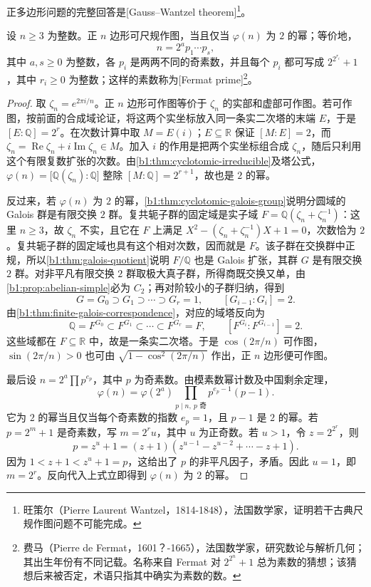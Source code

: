 \ProseParagraphBreak
正多边形问题的完整回答是[Gauss--Wantzel theorem]\footnote{旺策尔（Pierre Laurent Wantzel，1814-1848），法国数学家，证明若干古典尺规作图问题不可能完成。}。

\begin{theorem}\label{b1:thm:constructible-polygon}
	设 \(n\geq3\) 为整数。正 \(n\) 边形可尺规作图，当且仅当 \(\varphi(n)\) 为 \(2\) 的幂；等价地，
	\[
		n=2^a p_1\cdots p_s,
	\]
	其中 \(a,s\geq0\) 为整数，各 \(p_i\) 是两两不同的奇素数，并且每个 \(p_i\) 都可写成 \(2^{2^{r_i}}+1\)，其中 \(r_i\geq0\) 为整数；这样的素数称为[Fermat prime]\footnote{费马（Pierre de Fermat，1601？-1665），法国数学家，研究数论与解析几何；其出生年份有不同记载。名称来自 Fermat 对 \(2^{2^n}+1\) 总为素数的猜想；该猜想后来被否定，术语只指其中确实为素数的数。}。
\end{theorem}
\begin{proof}
	取 \(\zeta_n=e^{2\pi i/n}\)。正 \(n\) 边形可作图等价于 \(\zeta_n\) 的实部和虚部可作图。若可作图，按前面的合成域论证，将这两个实坐标放入同一条实二次塔的末端 \(E\)，于是 \([E:\mathbb Q]=2^r\)。在次数计算中取 \(M=E(i)\)；\(E\subseteq\mathbb R\) 保证 \([M:E]=2\)，而 \(\zeta_n=\operatorname{Re}\zeta_n+i\operatorname{Im}\zeta_n\in M\)。加入 \(i\) 的作用是把两个实坐标组合成 \(\zeta_n\)，随后只利用这个有限复数扩张的次数。由\cref{b1:thm:cyclotomic-irreducible}及塔公式，\(\varphi(n)=\bigl[\mathbb Q(\zeta_n):\mathbb Q\bigr]\) 整除 \([M:\mathbb Q]=2^{r+1}\)，故也是 \(2\) 的幂。

	反过来，若 \(\varphi(n)\) 为 \(2\) 的幂，\cref{b1:thm:cyclotomic-galois-group}说明分圆域的 Galois 群是有限交换 \(2\) 群。复共轭子群的固定域是实子域 \(F=\mathbb Q(\zeta_n+\zeta_n^{-1})\)：这里 \(n\geq3\)，故 \(\zeta_n\) 不实，且它在 \(F\) 上满足 \(X^2-(\zeta_n+\zeta_n^{-1})X+1=0\)，次数恰为 \(2\)。复共轭子群的固定域也具有这个相对次数，因而就是 \(F\)。该子群在交换群中正规，所以\cref{b1:thm:galois-quotient}说明 \(F/\mathbb Q\) 也是 Galois 扩张，其群 \(G\) 是有限交换 \(2\) 群。对非平凡有限交换 \(2\) 群取极大真子群，所得商既交换又单，由\cref{b1:prop:abelian-simple}必为 \(C_2\)；再对阶较小的子群归纳，得到
	\[
		G=G_0\supset G_1\supset\cdots\supset G_r=1, \qquad [G_{i-1}:G_i]=2.
	\]
	由\cref{b1:thm:finite-galois-correspondence}，对应的域塔反向为
	\[
		\mathbb Q=F^{G_0}\subset F^{G_1}\subset\cdots\subset F^{G_r}=F, \qquad [F^{G_i}:F^{G_{i-1}}]=2.
	\]
	这些域都在 \(F\subseteq\mathbb R\) 中，故是一条实二次塔。于是 \(\cos(2\pi/n)\) 可作图，\(\sin(2\pi/n)>0\) 也可由 \(\sqrt{1-\cos^2(2\pi/n)}\) 作出，正 \(n\) 边形便可作图。

	最后设 \(n=2^a\prod p^{e_p}\)，其中 \(p\) 为奇素数。由模素数幂计数及中国剩余定理，
	\[
		\varphi(n)=\varphi(2^a)\prod_{p\mid n,\ p\text{ 奇}}p^{e_p-1}(p-1).
	\]
	它为 \(2\) 的幂当且仅当每个奇素数的指数 \(e_p=1\)，且 \(p-1\) 是 \(2\) 的幂。若 \(p=2^m+1\) 是奇素数，写 \(m=2^r u\)，其中 \(u\) 为正奇数。若 \(u>1\)，令 \(z=2^{2^r}\)，则
	\[
		p=z^u+1=(z+1)(z^{u-1}-z^{u-2}+\cdots-z+1).
	\]
	因为 \(1<z+1<z^u+1=p\)，这给出了 \(p\) 的非平凡因子，矛盾。因此 \(u=1\)，即 \(m=2^r\)。反向代入上式立即得到 \(\varphi(n)\) 为 \(2\) 的幂。
\end{proof}

